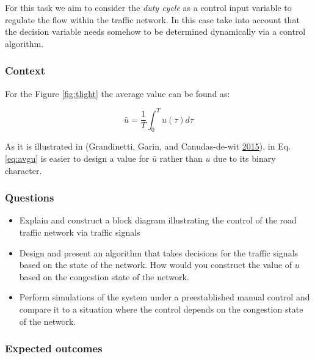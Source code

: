 \documentclass[]{book}
\theoremstyle{definition}
\theoremstyle{definition}
\theoremstyle{definition}
\theoremstyle{remark}
\begin{document}
For this task we aim to consider the \emph{duty cycle} as a control
input variable to regulate the flow within the traffic network. In this
case take into account that the decision variable needs somehow to be
determined dynamically via a control algorithm.

\hypertarget{context-3}{%
\subsubsection*{Context}\label{context-3}}

For the Figure \ref{fig:tlight} the average value can be found as:

\begin{equation}
\bar{u} = \frac{1}{T}\int_0^T u(\tau) d\tau \label{eq:avgu}
\end{equation}

As it is illustrated in (Grandinetti, Garin, and Canudas-de-wit
\protect\hyperlink{ref-Grandinetti2016}{2015}), in Eq. \eqref{eq:avgu} is
easier to design a value for \(\bar{u}\) rather than \(u\) due to its
binary character.

\hypertarget{questions-2}{%
\subsubsection*{Questions}\label{questions-2}}

\begin{itemize}
\item
  Explain and construct a block diagram illustrating the control of the
  road traffic network via traffic signals
\item
  Design and present an algorithm that takes decisions for the traffic
  signals based on the state of the network. How would you construct the
  value of \(u\) based on the congestion state of the network.
\item
  Perform simulations of the system under a preestablished manual
  control and compare it to a situation where the control depends on the
  congestion state of the network.
\end{itemize}

\hypertarget{expected-outcomes-2}{%
\subsubsection*{Expected outcomes}\label{expected-outcomes-2}}
\end{document}
